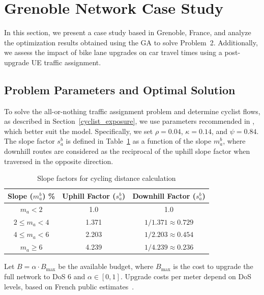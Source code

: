 \documentclass[letterpaper, 10 pt, conference]{ieeeconf}  %
\begin{document}
\section{Grenoble Network Case Study}
\label{case_study}

In this section, we present a case study based in Grenoble, France, and analyze the optimization results obtained using the GA to solve Problem~2. Additionally, we assess the impact of bike lane upgrades on car travel times using a post-upgrade UE traffic assignment.

\subsection{Problem Parameters and Optimal Solution}

To solve the all-or-nothing traffic assignment problem and determine cyclist flows, as described in Section~\ref{cyclist_exposure}, we use parameters recommended in \cite{cooper2017using}, which better suit the model. Specifically, we set $\rho = 0.04$, $\kappa = 0.14$, and $\psi = 0.84$. The slope factor $s_a^{b}$ is defined in Table~\ref{table:slope_factors} as a function of the slope $m_{a}^{b}$, where downhill routes are considered as the reciprocal of the uphill slope factor when traversed in the opposite direction.

\begin{table}[h!]
\vspace{0.2cm}
\centering
\begin{tabular}{c|c|c}
\hline
Slope ($m_a^{b}$) \% & Uphill Factor ($s_a^{b}$) & Downhill Factor ($s_a^{b}$) \\ \hline
$m_a < 2$ & 1.0 & 1.0 \\ 
$2 \leq m_a < 4$ & 1.371 & $1/1.371 \approx 0.729$ \\ 
$4 \leq m_a < 6$ & 2.203 & $1/2.203 \approx 0.454$ \\ 
$m_a \geq 6$ & 4.239 & $1/4.239 \approx 0.236$ \\ \hline
\end{tabular}
\caption{\footnotesize Slope factors for cycling distance calculation}
\label{table:slope_factors}
\end{table}

Let $B = \alpha \cdot B_{\text{max}}$ be the available budget, where $B_{\text{max}}$ is the cost to upgrade the full network to DoS 6 and $\alpha \in [0,1]$. Upgrade costs per meter depend on DoS levels, based on French public estimates~\cite{cerema2024_cost}.
\end{document}
